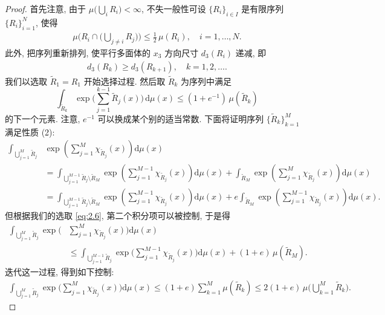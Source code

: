 \begin{proof}
首先注意, 由于 $\mu\bigl(\bigcup_i R_i\bigr) < \infty$, 不失一般性可设 $\{R_i\}_{i \in I}$ 是有限序列 $\{R_i\}_{i=1}^N$, 使得
\begin{align*}
  \mu\Big(R_{i}\cap\Big(\bigcup_{j\neq i}R_{j}\Big)\Big)\leq\frac{1}{2}\,\mu(R_{i}),\quad i=1,\ldots,N.
\end{align*}
此外, 把序列重新排列, 使平行多面体的 $x_3$ 方向尺寸 $d_3(R_i)$ 递减, 即
\begin{align*}
  d_{3}(R_{k})\geq d_{3}(R_{k+1}),\quad k=1,2,\ldots .
\end{align*}
我们以选取 $\tilde{R}_1 = R_1$ 开始选择过程. 然后取 $\tilde{R}_k$ 为序列中满足
\begin{equation}\label{eq:2.6}
  \int_{\tilde{R}_{k}}\exp\Big(\sum_{j=1}^{k-1}\tilde{R}_{j}(x)\Big)\,\mathrm{d}\mu(x)
  \leq(1+e^{-1})\,\mu(\tilde{R}_{k})
\end{equation}
的下一个元素. 注意, $e^{-1}$ 可以换成某个别的适当常数. 下面将证明序列 $\{\tilde{R}_k\}_{k=1}^M$ 满足性质 (2):
\begin{align*}
  \int_{\bigcup_{j=1}^{M}\widetilde{R}_{j}}&\exp\left(\sum_{j=1}^{M}\chi_{\widetilde{R}_{j}}(x)\right)\mathrm{d}\mu(x)\\
  &=\int_{\bigcup_{j=1}^{M-1}\widetilde{R}_{j}\setminus\widetilde{R}_{M}}\exp\left(\sum_{j=1}^{M-1}\chi_{\widetilde{R}_{j}}(x)\right)\mathrm{d}\mu(x)
   +\int_{\widetilde{R}_{M}}\exp\left(\sum_{j=1}^{M}\chi_{\widetilde{R}_{j}}(x)\right)\mathrm{d}\mu(x)\\
  &=\int_{\bigcup_{j=1}^{M-1}\widetilde{R}_{j}\setminus\widetilde{R}_{M}}\exp\left(\sum_{j=1}^{M-1}\chi_{\widetilde{R}_{j}}(x)\right)\mathrm{d}\mu(x)
   +e\int_{\widetilde{R}_{M}}\exp\left(\sum_{j=1}^{M-1}\chi_{\widetilde{R}_{j}}(x)\right)\mathrm{d}\mu(x).
\end{align*}
但根据我们的选取 \eqref{eq:2.6}, 第二个积分项可以被控制, 于是得
\begin{align*}
  \int_{\bigcup_{j=1}^{M}\tilde{R}_{j}}\exp\Big(&\sum_{j=1}^{M}\chi_{\tilde{R}_{j}}(x)\Big)\mathrm{d}\mu(x)\\
  &\leq\int_{\bigcup_{j=1}^{M-1}\tilde{R}_{j}}\exp\Big(\sum_{j=1}^{M-1}\chi_{\tilde{R}_{j}}(x)\Big)\mathrm{d}\mu(x)+(1+e)\,\mu(\tilde{R}_{M}).
\end{align*}
迭代这一过程, 得到如下控制:
\begin{align*}
  \int_{\bigcup_{j=1}^{M}\tilde{R}_{j}}\exp\Big(\sum_{j=1}^{M}\chi_{\tilde{R}_{j}}(x)\Big)\mathrm{d}\mu(x)
  \leq(1+e)\sum_{k=1}^{M}\mu(\tilde{R}_{k})
  \leq 2(1+e)\,\mu\Big(\bigcup_{k=1}^{M}\tilde{R}_{k}\Big).
\end{align*}


\end{proof}
